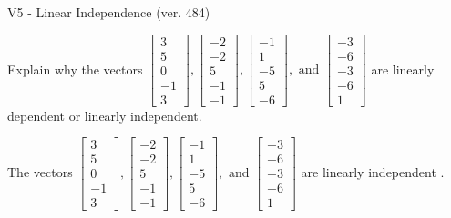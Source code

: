 \begin{exercise}
  \begin{exerciseTitle}V5 - Linear Independence (ver. 484)\end{exerciseTitle}
  \begin{exerciseStatement}
    Explain why the vectors \(\left[\begin{array}{r}
3 \\
5 \\
0 \\
-1 \\
3
\end{array}\right] , \left[\begin{array}{r}
-2 \\
-2 \\
5 \\
-1 \\
-1
\end{array}\right] , \left[\begin{array}{r}
-1 \\
1 \\
-5 \\
5 \\
-6
\end{array}\right] , \text{ and } \left[\begin{array}{r}
-3 \\
-6 \\
-3 \\
-6 \\
1
\end{array}\right]\) are linearly dependent or linearly independent.	


  \end{exerciseStatement}
  \begin{exerciseAnswer}
   The vectors \(\left[\begin{array}{r}
3 \\
5 \\
0 \\
-1 \\
3
\end{array}\right] , \left[\begin{array}{r}
-2 \\
-2 \\
5 \\
-1 \\
-1
\end{array}\right] , \left[\begin{array}{r}
-1 \\
1 \\
-5 \\
5 \\
-6
\end{array}\right] , \text{ and } \left[\begin{array}{r}
-3 \\
-6 \\
-3 \\
-6 \\
1
\end{array}\right]\) are 
  	 linearly independent  .
  


  \end{exerciseAnswer}
\end{exercise}